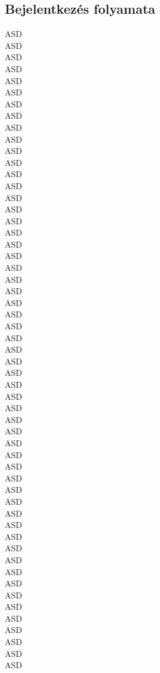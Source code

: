 \subsection{Bejelentkezés folyamata}
ASD
\\ASD
\\ASD
\\ASD
\\ASD
\\ASD
\\ASD
\\ASD
\\ASD
\\ASD
\\ASD
\\ASD
\\ASD
\\ASD
\\ASD
\\ASD
\\ASD
\\ASD
\\ASD
\\ASD
\\ASD
\\ASD
\\ASD
\\ASD
\\ASD
\\ASD
\\ASD
\\ASD
\\ASD
\\ASD
\\ASD
\\ASD
\\ASD
\\ASD
\\ASD
\\ASD
\\ASD
\\ASD
\\ASD
\\ASD
\\ASD
\\ASD
\\ASD
\\ASD
\\ASD
\\ASD
\\ASD
\\ASD
\\ASD
\\ASD
\\ASD
\\ASD
\\ASD
\\ASD
\\ASD


\newpage
